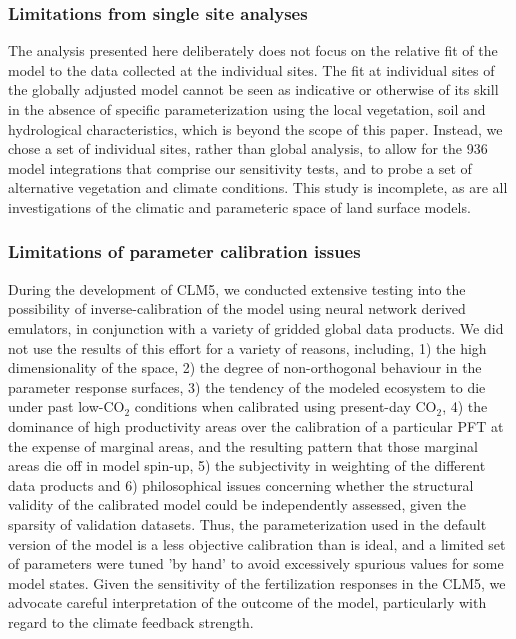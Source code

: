 \documentclass[draft,linenumbers]{agujournal}
\begin{document}
\subsubsection{Limitations from single site analyses}
The analysis presented here deliberately does not focus on the relative fit of the model to the data collected at the individual sites. The fit at individual sites of the globally adjusted model cannot be seen as indicative or otherwise of its skill in the absence of specific parameterization using the local vegetation, soil and hydrological characteristics, which is beyond the scope of this paper. Instead, we chose a set of individual sites, rather than global analysis, to allow for the 936 model integrations that comprise our sensitivity tests, and to probe a set of alternative vegetation and climate conditions. This study is incomplete, as are all investigations of the climatic and parameteric space of land surface models. 

\subsubsection{Limitations of parameter calibration issues}
During the development of CLM5, we conducted extensive testing into the possibility of inverse-calibration of the model using neural network derived emulators, in conjunction with a variety of gridded global data products. We did not use the results of this effort for a variety of reasons, including,  1) the high dimensionality of the space, 2) the degree of non-orthogonal behaviour in the parameter response surfaces,  3) the tendency of the modeled ecosystem to die under past low-CO$_{2}$ conditions when calibrated using present-day CO$_{2}$, 4) the dominance of high productivity areas over the calibration of a particular PFT at the expense of marginal areas, and the resulting pattern that those marginal areas die off in model spin-up, 5) the subjectivity in weighting of the different data products and 6) philosophical issues concerning whether the structural validity of the calibrated model could be independently assessed, given the sparsity of validation datasets. Thus, the parameterization used in the default version of the model is a less objective calibration than is ideal, and a limited set of parameters were tuned 'by hand' to avoid excessively spurious values for some model states.  Given the sensitivity of the fertilization responses in the CLM5, we advocate careful interpretation of the outcome of the model, particularly with regard to the climate feedback strength.
\end{document}
